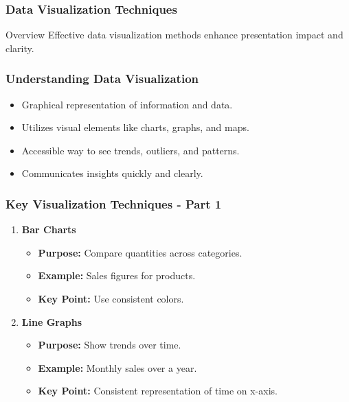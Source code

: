 \documentclass[aspectratio=169]{beamer}
\begin{document}
\begin{frame}[fragile]
    \frametitle{Data Visualization Techniques}
    \begin{block}{Overview}
        Effective data visualization methods enhance presentation impact and clarity.
    \end{block}
\end{frame}

\begin{frame}[fragile]
    \frametitle{Understanding Data Visualization}
    \begin{itemize}
        \item Graphical representation of information and data.
        \item Utilizes visual elements like charts, graphs, and maps.
        \item Accessible way to see trends, outliers, and patterns.
        \item Communicates insights quickly and clearly.
    \end{itemize}
\end{frame}

\begin{frame}[fragile]
    \frametitle{Key Visualization Techniques - Part 1}
    \begin{enumerate}
        \item \textbf{Bar Charts}
            \begin{itemize}
                \item \textbf{Purpose:} Compare quantities across categories.
                \item \textbf{Example:} Sales figures for products.
                \item \textbf{Key Point:} Use consistent colors.
            \end{itemize}
        \item \textbf{Line Graphs}
            \begin{itemize}
                \item \textbf{Purpose:} Show trends over time.
                \item \textbf{Example:} Monthly sales over a year.
                \item \textbf{Key Point:} Consistent representation of time on x-axis.
            \end{itemize}
    \end{enumerate}
\end{frame}
\end{document}
